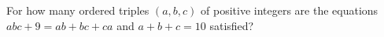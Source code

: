 For how many ordered triples $ (a,b,c)$ of positive integers are the equations $ abc+9 = ab+bc+ca$ and $ a+b+c = 10$ satisfied?